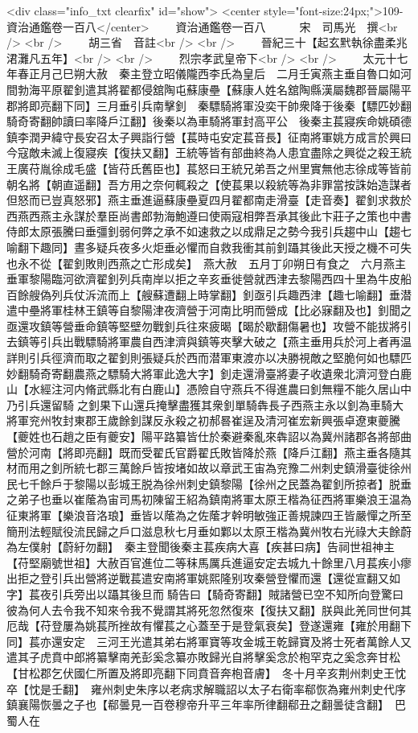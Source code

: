 <div class="info_txt clearfix" id="show">
<center style="font-size:24px;">109-資治通鑑卷一百八</center>
  　　資治通鑑卷一百八　　　宋　司馬光　撰<br />
<br />
　　胡三省　音註<br />
<br />
　　晉紀三十【起玄黓執徐盡柔兆涒灘凡五年】<br />
<br />
　　烈宗孝武皇帝下<br />
<br />
　　太元十七年春正月己巳朔大赦　秦主登立昭儀隴西李氏為皇后　二月壬寅燕主垂自魯口如河間勃海平原翟釗遣其將翟都侵舘陶屯蘇康壘【蘇康人姓名舘陶縣漢屬魏郡晉屬陽平郡將即亮翻下同】三月垂引兵南擊釗　秦驃騎將軍没奕干帥衆降于後秦【驃匹妙翻騎奇寄翻帥讀曰率降戶江翻】後秦以為車騎將軍封高平公　後秦主萇寢疾命姚碩德鎮李潤尹緯守長安召太子興詣行營【萇時屯安定萇音長】征南將軍姚方成言於興曰今寇敵未滅上復寢疾【復扶又翻】王統等皆有部曲終為人患宜盡除之興從之殺王統王廣苻胤徐成毛盛【皆苻氏舊臣也】萇怒曰王統兄弟吾之州里實無他志徐成等皆前朝名將【朝直遥翻】吾方用之奈何輒殺之【使萇果以殺統等為非罪當按誅始造謀者但怒而已豈真怒邪】燕主垂進逼蘇康壘夏四月翟都南走滑臺【走音奏】翟釗求救於西燕西燕主永謀於羣臣尚書郎勃海鮑遵曰使兩寇相弊吾承其後此卞莊子之策也中書侍郎太原張騰曰垂彊釗弱何弊之承不如速救之以成鼎足之勢今我引兵趨中山【趨七喻翻下趣同】晝多疑兵夜多火炬垂必懼而自救我衝其前釗躡其後此天授之機不可失也永不從【翟釗敗則西燕之亡形成矣】　燕大赦　五月丁卯朔日有食之　六月燕主垂軍黎陽臨河欲濟翟釗列兵南岸以拒之辛亥垂徙營就西津去黎陽西四十里為牛皮船百餘艘偽列兵仗泝流而上【艘蘇遭翻上時掌翻】釗亟引兵趣西津【趣七喻翻】垂潜遣中壘將軍桂林王鎮等自黎陽津夜濟營于河南比明而營成【比必寐翻及也】釗聞之亟還攻鎮等營垂命鎮等堅壁勿戰釗兵往來疲暍【暍於歇翻傷暑也】攻營不能拔將引去鎮等引兵出戰驃騎將軍農自西津濟與鎮等夾擊大破之【燕主垂用兵於河上者再温詳則引兵徑濟而取之翟釗則張疑兵於西而潜軍東渡亦以决勝視敵之堅脆何如也驃匹妙翻騎奇寄翻農燕之驃騎大將軍此逸大字】釗走還滑臺將妻子收遺衆北濟河登白鹿山【水經注河内脩武縣北有白鹿山】憑險自守燕兵不得進農曰釗無糧不能久居山中乃引兵還留騎之釗果下山還兵掩擊盡獲其衆釗單騎犇長子西燕主永以釗為車騎大將軍兖州牧封東郡王歲餘釗謀反永殺之初郝晷崔逞及清河崔宏新興張卓遼東夔騰【夔姓也石趙之臣有夔安】陽平路纂皆仕於秦避秦亂來犇詔以為冀州諸郡各將部曲營於河南【將即亮翻】既而受翟氏官爵翟氏敗皆降於燕【降戶江翻】燕主垂各隨其材而用之釗所統七郡三萬餘戶皆按堵如故以章武王宙為兖豫二州刺史鎮滑臺徙徐州民七千餘戶于黎陽以彭城王脱為徐州刺史鎮黎陽【徐州之民蓋為翟釗所掠者】脱垂之弟子也垂以崔䕃為宙司馬初陳留王紹為鎮南將軍太原王楷為征西將軍樂浪王温為征東將軍【樂浪音洛琅】垂皆以䕃為之佐䕃才幹明敏強正善規諫四王皆嚴憚之所至簡刑法輕賦役流民歸之戶口滋息秋七月垂如鄴以太原王楷為冀州牧右光祿大夫餘蔚為左僕射【蔚紆勿翻】　秦主登聞後秦主萇疾病大喜【疾甚曰病】告祠世祖神主【苻堅廟號世祖】大赦百官進位二等秣馬厲兵進逼安定去城九十餘里八月萇疾小瘳出拒之登引兵出營將逆戰萇遣安南將軍姚熙隆别攻秦營登懼而還【還從宣翻又如字】萇夜引兵旁出以躡其後旦而騎告曰【騎奇寄翻】賊諸營已空不知所向登驚曰彼為何人去令我不知來令我不覺謂其將死忽然復來【復扶又翻】朕與此羌同世何其厄哉【苻登屢為姚萇所挫故有懼萇之心蓋至于是登氣衰矣】登遂還雍【雍於用翻下同】萇亦還安定　三河王光遣其弟右將軍寶等攻金城王乾歸寶及將士死者萬餘人又遣其子虎賁中郎將纂擊南羌彭奚念纂亦敗歸光自將擊奚念於枹罕克之奚念奔甘松【甘松郡乞伏國仁所置及將即亮翻下同賁音奔枹音膚】　冬十月辛亥荆州刺史王忱卒【忱是壬翻】　雍州刺史朱序以老病求解職詔以太子右衛率郗恢為雍州刺史代序鎮襄陽恢曇之子也【郗曇見一百卷穆帝升平三年率所律翻郗丑之翻曇徒含翻】　巴蜀人在